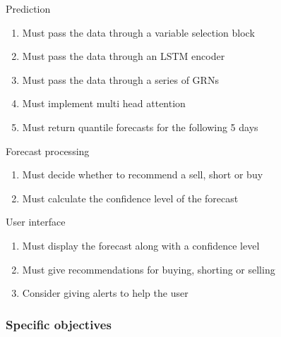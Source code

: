 \documentclass{article}
\begin{document}
Prediction
\begin{enumerate}
    \item Must pass the data through a variable selection block
    \item Must pass the data through an LSTM encoder
    \item Must pass the data through a series of GRNs
    \item Must implement multi head attention
    \item Must return quantile forecasts for the following 5 days
\end{enumerate}

Forecast processing
\begin{enumerate}
    \item Must decide whether to recommend a sell, short or buy
    \item  Must calculate the confidence level of the forecast
\end{enumerate}

User interface
\begin{enumerate}
    \item Must display the forecast along with a confidence level
    \item Must give recommendations for buying, shorting or selling
    \item Consider giving alerts to help the user
\end{enumerate}

\subsubsection{Specific objectives}
\end{document}
